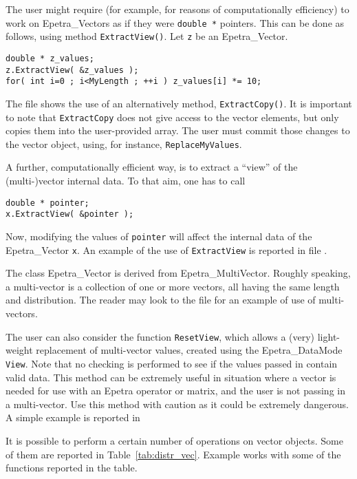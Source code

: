 The user might require (for example, for reasons of computationally
efficiency) to work on Epetra\_Vectors as if they were \verb!double *!
pointers. This can be done as follows, using method
\verb!ExtractView()!. Let \verb!z! be an Epetra\_Vector. 
\begin{verbatim}
double * z_values;
z.ExtractView( &z_values );
for( int i=0 ; i<MyLength ; ++i ) z_values[i] *= 10;
\end{verbatim}
The file  shows the use of an alternatively
method, \verb!ExtractCopy()!.  It is important to note that
\verb!ExtractCopy! does not give access to the vector elements, but only
copies them into the user-provided array.  The user must commit those
changes to the vector object, using, for instance,
\verb!ReplaceMyValues!.

A further, computationally efficient way, is to extract a ``view'' of the
(multi-)vector internal data.  To that aim, one has to call
\begin{verbatim}
double * pointer;
x.ExtractView( &pointer );
\end{verbatim}
Now, modifying the values of \verb!pointer! will affect the internal
data of the Epetra\_Vector \verb!x!.  An example of the use of
\verb!ExtractView! is reported in file .

\begin{remark}
  The class Epetra\_Vector is derived from Epetra\_MultiVector. Roughly
  speaking, a multi-vector is a collection of one or more vectors, all
  having the same length and distribution. The reader may look to the
  file  for an example of use of multi-vectors.
\end{remark}

The user can also consider the function \verb!ResetView!, which allows a
(very) light-weight replacement of multi-vector values, created using
the Epetra\_DataMode \verb!View!. Note that no checking is performed to
see if the values passed in contain valid data. This method can be
extremely useful in situation where a vector is needed for use with an
Epetra operator or matrix, and the user is not passing in a
multi-vector. Use this method with caution as it could be extremely
dangerous.
A simple example is reported in 

\medskip

It is possible to perform a certain number of operations on vector
objects. Some of them are reported in Table~\ref{tab:distr_vec}.
Example  works with some of the functions reported in
the table.

